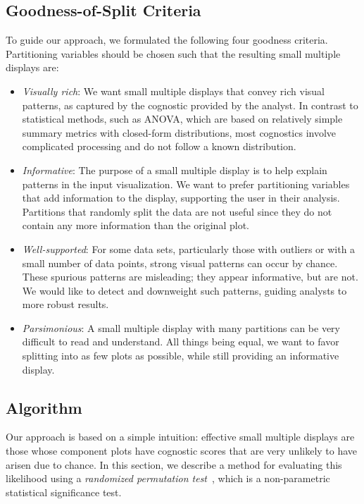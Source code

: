 \subsection{Goodness-of-Split Criteria}
To guide our approach, we formulated the following four goodness criteria. Partitioning variables should be chosen such that the resulting small multiple displays are:
\begin{itemize}
\item \emph{Visually rich}: We want small multiple displays that convey rich visual patterns, as captured by the cognostic provided by the analyst. In contrast to statistical methods, such as ANOVA, which are based on relatively simple summary metrics with closed-form distributions, most cognostics involve complicated processing and do not follow a known distribution.

\item \emph{Informative}: The purpose of a small multiple display is to help explain patterns in the input visualization. We want to prefer partitioning variables that add information to the display, supporting the user in their analysis. Partitions that randomly split the data are not useful since they do not contain any more information than the original plot.

\item \emph{Well-supported}: For some data sets, particularly those with outliers or with a small number of data points, strong visual patterns can occur by chance. These spurious patterns are misleading; they appear informative, but are not. We would like to detect and downweight such  patterns, guiding analysts to more robust results.

\item \emph{Parsimonious}: A small multiple display with many partitions can be very difficult to read and understand. All things being equal, we want to favor splitting into as few plots as possible, while still providing an informative display.
\end{itemize}

\subsection{Algorithm}

Our approach is based on a simple intuition: effective small multiple displays are those whose component plots have cognostic scores that are very unlikely to have arisen due to chance. In this section, we describe a method for evaluating this likelihood using a \emph{randomized permutation test}~\cite{Good2000}, which is a non-parametric statistical significance test.

